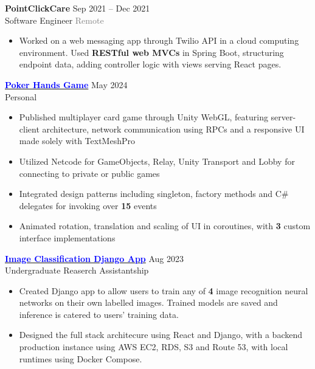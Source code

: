 \documentclass[10pt]{developercv} %
\begin{document}
\begin{minipage}[t]{\textwidth}
	\textbf{PointClickCare} \hfill Sep 2021 -- Dec 2021 \\
	Software Engineer \hfill \textcolor{gray}{Remote}
	\begin{itemize}[noitemsep,topsep=0pt]
		\item Worked on a web messaging app through Twilio API in a cloud computing environment.
		Used \textbf{RESTful web MVCs} in Spring Boot, structuring endpoint data,
		adding controller logic with views serving React pages.
	\end{itemize}
\end{minipage}


\begin{minipage}[t]{\textwidth}
	\vspace{-\baselineskip}
	\textbf{\href{https://henryhu.dev/pokerbsgame/index.html}{\textcolor{blue}{Poker Hands Game}}} \hfill May 2024 \\
	Personal
	\begin{itemize}[noitemsep,topsep=0pt]
		\item Published multiplayer card game through Unity WebGL, featuring server-client architecture,
		network communication using RPCs and a responsive UI made solely with TextMeshPro
		\item Utilized Netcode for GameObjects, Relay, Unity Transport and Lobby for connecting to private or public games
		\item Integrated design patterns including singleton, factory methods and C\# delegates for invoking over \textbf{15} events
		\item Animated rotation, translation and scaling of UI in coroutines, with \textbf{3} custom interface implementations
	\end{itemize}
	\vspace{0.3em}

	\textbf{\href{https://uclassify.henryhu.dev}{\textcolor{blue}{Image Classification Django App}}} \hfill Aug 2023\\
	Undergraduate Reaserch Assistantship
	\begin{itemize}[noitemsep,topsep=0pt]
		\item Created Django app to allow users to train any of \textbf{4} image recognition neural networks on
		their own labelled images. Trained models are saved and inference is catered to users'
		training data.
		\item Designed the full stack architecure using React and Django, with a backend production instance using AWS EC2, RDS, S3 and Route 53,
		with local runtimes using Docker Compose.
	\end{itemize}
	\vspace{0.3em}


\end{minipage}
\end{document}
